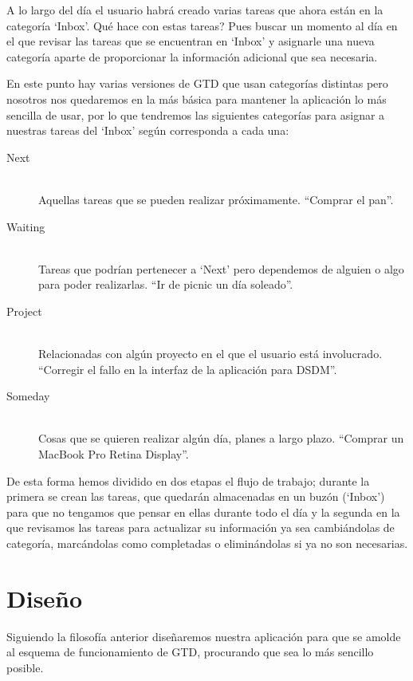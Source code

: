 \documentclass[parskip=half*]{scrartcl}
\begin{document}
A lo largo del d\'ia el usuario habr\'a creado varias tareas que ahora est\'an en la categor\'ia `Inbox'. \¿Qu\'e hace con estas tareas? Pues buscar un momento al d\'ia en el que revisar las tareas que se encuentran en `Inbox' y asignarle una nueva categor\'ia aparte de proporcionar la informaci\'on adicional que sea necesaria.

En este punto hay varias versiones de GTD que usan categor\'ias distintas pero nosotros nos quedaremos en la m\'as b\'asica para mantener la aplicaci\'on lo m\'as sencilla de usar, por lo que tendremos las siguientes categor\'ias para asignar a nuestras tareas del `Inbox' seg\'un corresponda a cada una:

\begin{description}
	\item[Next] \hfill \\ Aquellas tareas que se pueden realizar pr\'oximamente. ``Comprar el pan''.
	\item[Waiting] \hfill \\ Tareas que podr\'ian pertenecer a `Next' pero dependemos de alguien o algo para poder realizarlas. ``Ir de picnic un d\'ia soleado''.
	\item[Project] \hfill \\ Relacionadas con alg\'un proyecto en el que el usuario est\'a involucrado. ``Corregir el fallo en la interfaz de la aplicaci\'on para DSDM''.
	\item[Someday] \hfill \\ Cosas que se quieren realizar alg\'un d\'ia, planes a largo plazo. ``Comprar un MacBook Pro Retina Display''.
\end{description}

De esta forma hemos dividido en dos etapas el flujo de trabajo; durante la primera se crean las tareas, que quedar\'an almacenadas en un buz\'on (`Inbox') para que no tengamos que pensar en ellas durante todo el d\'ia y la segunda en la que revisamos las tareas para actualizar su informaci\'on ya sea cambi\'andolas de categor\'ia, marc\'andolas como completadas o elimin\'andolas si ya no son necesarias.

\section{Dise\~no}

Siguiendo la filosof\'ia anterior dise\~naremos nuestra aplicaci\'on para que se amolde al esquema de funcionamiento de GTD, procurando que sea lo m\'as sencillo posible.
\end{document}
